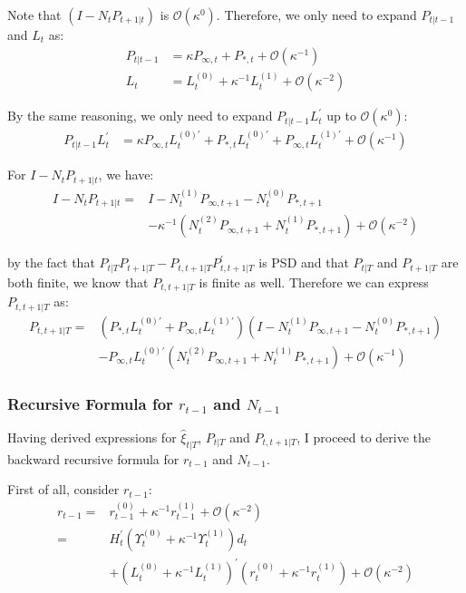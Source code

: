 \documentclass[12pt]{article}
\numberwithin{equation}{section}
\begin{document}
Note that $(I-N_tP_{t+1|t})$ is $\mathcal{O}(\kappa^0)$. Therefore, we only need to expand $P_{t|t-1}$ and $L_t$ as:
\begin{align*}
    P_{t|t-1} &= \kappa P_{\infty,t} + P_{*,t} + \mathcal{O}(\kappa^{-1}) \\
    L_t &= L_t^{(0)} + \kappa^{-1}L_t^{(1)} + \mathcal{O}(\kappa^{-2})
\end{align*}

By the same reasoning, we only need to expand $P_{t|t-1}L_t^{'}$ up to $\mathcal{O}(\kappa^0)$:
\begin{align*}
    P_{t|t-1}L_t^{'} &= \kappa P_{\infty,t}L_t^{(0)'}+P_{*,t}L_t^{(0)'}+P_{\infty,t}L_t^{(1)'}+\mathcal{O}(\kappa^{-1})
\end{align*}

For $I-N_tP_{t+1|t}$, we have:
\begin{align*}
    I-N_tP_{t+1|t} =& I-N_t^{(1)}P_{\infty,t+1}-N_t^{(0)}P_{*,t+1} \\
    &-\kappa^{-1}(N_t^{(2)}P_{\infty,t+1}+N_t^{(1)}P_{*,t+1})+\mathcal{O}(\kappa^{-2})
\end{align*}

by the fact that $P_{t|T}P_{t+1|T}-P_{t,t+1|T}P_{t,t+1|T}^{'}$ is PSD and that $P_{t|T}$ and $P_{t+1|T}$ are both finite, we know that $P_{t,t+1|T}$ is finite as well. Therefore we can express $P_{t,t+1|T}$ as:
\begin{align*}
    P_{t,t+1|T} =& (P_{*,t}L_t^{(0)'}+P_{\infty,t}L_t^{(1)'})(I-N_t^{(1)}P_{\infty,t+1}-N_t^{(0)}P_{*,t+1}) \\
    &- P_{\infty,t}L_t^{(0)'}(N_t^{(2)}P_{\infty,t+1}+N_t^{(1)}P_{*,t+1}) + \mathcal{O}(\kappa^{-1})
\end{align*}

\subsubsection{Recursive Formula for $r_{t-1}$ and $N_{t-1}$}
Having derived expressions for $\hat{\xi}_{t|T}$, $P_{t|T}$ and $P_{t,t+1|T}$, I proceed to derive the backward recursive formula for $r_{t-1}$ and $N_{t-1}$.

First of all, consider $r_{t-1}$:
\begin{align*}
    r_{t-1} =& r_{t-1}^{(0)} + \kappa^{-1}r_{t-1}^{(1)} + \mathcal{O}(\kappa^{-2}) \\
    =& H_t^{'}(\Upsilon_t^{(0)}+ \kappa^{-1}\Upsilon_t^{(1)})d_t \\
    &+ (L_t^{(0)} + \kappa^{-1}L_t^{(1)})^{'}(r_t^{(0)}+\kappa^{-1}r_t^{(1)}) + \mathcal{O}(\kappa^{-2})
\end{align*}
\end{document}
